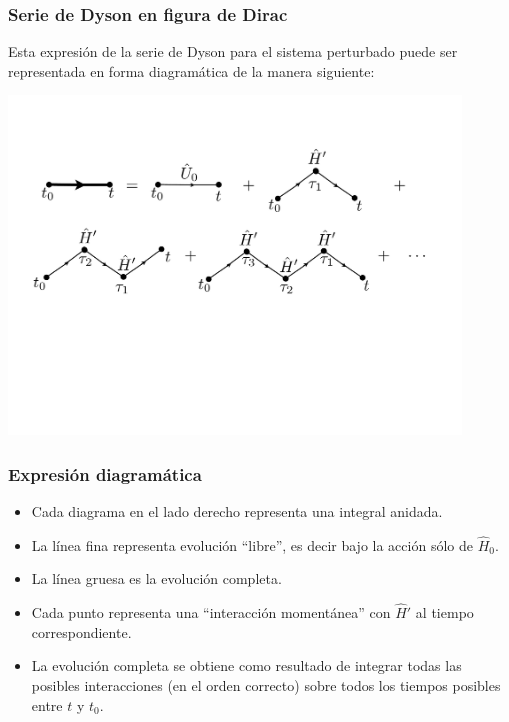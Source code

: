 \documentclass{beamer}
\begin{document}
\begin{frame}
    \frametitle{Serie de Dyson en figura de Dirac}
    Esta expresión de la serie de Dyson para el sistema perturbado puede ser representada en forma diagramática de la manera siguiente:
    \begin{center}
        \includegraphics[width=12cm]{figs/dyson1.pdf} 
    \end{center}
\end{frame}

\begin{frame}
    \frametitle{Expresión diagramática}
    \begin{itemize}
        \item Cada diagrama en el lado derecho representa una integral anidada.
        \item La línea fina representa evolución ``libre'', es decir bajo la acción sólo de $\hat{H}_0$.
        \item La línea gruesa es la evolución completa.
        \item Cada punto representa una ``interacción momentánea'' con $\hat{H}'$ al tiempo correspondiente.
        \item La evolución completa se obtiene como resultado de integrar todas las posibles interacciones (en el orden correcto) sobre todos los tiempos posibles entre $t$ y $t_0$.
    \end{itemize}
\end{frame}
\end{document}
